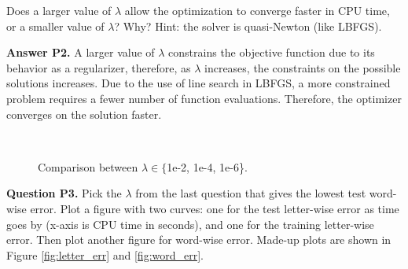 \documentclass[11pt]{report}
\begin{document}
Does a larger value of $\lambda$ allow the optimization to converge faster in CPU time,
or a smaller value of $\lambda$?  Why?
Hint: the solver is quasi-Newton (like LBFGS).

{\bf Answer P2.} A larger value of $\lambda$ constrains the objective function due to its behavior as a regularizer, therefore, as $\lambda$ increases, the constraints on the possible solutions increases. Due to the use of line search in LBFGS, a more constrained problem requires a fewer number of function evaluations. Therefore, the optimizer converges on the solution faster.

\begin{figure}[t]
\centering
{}
~~
~~
\caption{Comparison between $\lambda \in \{${\sf 1e-2, 1e-4, 1e-6}\}.}
\label{fig:compare_sgd}
\end{figure}

{\bf Question P3.}
Pick the $\lambda$ from the last question that gives the lowest test word-wise error.
Plot a figure with two curves:
one for the test letter-wise error as time goes by (x-axis is CPU time in seconds),
and one for the training letter-wise error.
Then plot another figure for word-wise error.
Made-up plots are shown in Figure \ref{fig:letter_err} and \ref{fig:word_err}.
\end{document}
